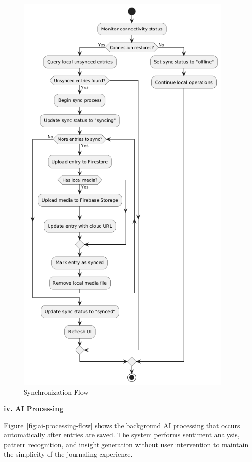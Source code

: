 \begin{figure}[H]
\centering
\includegraphics[width=0.95\textwidth,height=0.7\textheight,keepaspectratio]{files/imgs/sync_flow.png}
\caption{Synchronization Flow}
\label{fig:sync-flow}
\end{figure}
\clearpage

\textbf{iv. AI Processing}

Figure~\ref{fig:ai-processing-flow} shows the background AI processing that occurs automatically after entries are saved. The system performs sentiment analysis, pattern recognition, and insight generation without user intervention to maintain the simplicity of the journaling experience.

